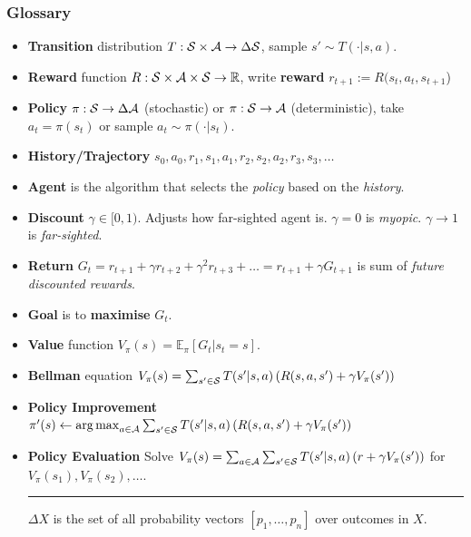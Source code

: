 \begin{frame}
	\small{
    \frametitle{Glossary}
    \begin{itemize}
        \item \textbf{Transition} distribution $T : \S \times \A \to \Delta \S$, sample $s' \sim T(\cdot | s,a)$.
        \item \textbf{Reward} function $R : \S \times \A \times \S \to \mathbb{R}$, write \textbf{reward} $r_{t+1} := R(s_t, a_t, s_{t+1}$)
        \item \textbf{Policy} $\pi : \S \to \Delta \A$ (stochastic) or $\pi : \S \to \A$ (deterministic), take $a_{t} = \pi(s_t)$ or sample $a_{t} \sim \pi(\cdot | s_t)$.
        \item \textbf{History/Trajectory}
        $
        s_0, a_0, r_1, s_1, a_1, r_2, s_2, a_2, r_3, s_3, \ldots
        $
        \item \textbf{Agent} is the algorithm that selects the \textit{policy} based on the \textit{history}.
        \item \textbf{Discount} $\gamma \in [0,1)$. Adjusts how far-sighted agent is. $\gamma = 0$ is \emph{myopic}. $\gamma \to 1$ is \emph{far-sighted}.
        \item \textbf{Return} $G_t = r_{t+1} + \gamma r_{t+2} + \gamma^2 r_{t+3} + \ldots = r_{t+1} + \gamma G_{t+1}$ is sum of \textit{future discounted rewards}.
        \item \textbf{Goal} is to \textbf{maximise} $G_t$.
        \item \textbf{Value} function $V_{\pi}(s) = \mathbb{E}_\pi [ G_t | s_t = s]$.
        \item \textbf{Bellman} equation 
        $
        V_\pi(s) = \sum_{s' \in \S} T(s' | s, a) \left( R(s,a,s') + \gamma V_\pi(s') \right) 
        $ 
		\item \textbf{Policy Improvement}
			$
			\pi'(s) \leftarrow \argmax_{a \in \A} \sum_{s' \in \S} T(s' | s,a) 
			\left( R(s,a,s') + \gamma V_{\pi}(s') \right)
			$
		\item \textbf{Policy Evaluation}
			Solve
			$
			V_\pi(s) = \sum_{a \in \A} \sum_{s' \in \S} T(s' | s, a) \left( r + \gamma V_\pi(s') \right) 
			$ for $V_\pi(s_1), V_\pi(s_2), \ldots$.
        
        \hspace{0pt}
        \rule{0.3\textwidth}{0.5pt}
        \vspace{0.1cm}
        
        
        \footnotesize{$\Delta X$ is the set of all probability vectors $[p_1, \ldots, p_n]$ over outcomes in $X$.}
    \end{itemize}
	}
\end{frame}

